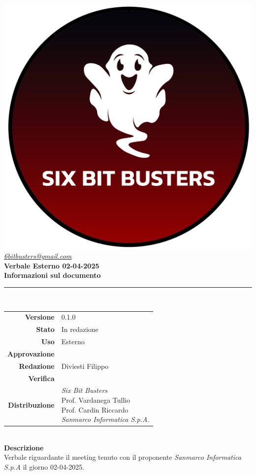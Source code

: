 \thispagestyle{empty}
\renewcommand{\arraystretch}{1.3}


\begin{titlepage}
	\begin{center}
		
	\includegraphics[scale = 0.7]{template/images/logo-circle.png}
	\\[1cm]
	\href{mailto:6bitbusters@gmail.com}		      	
	{\large{\textit{6bitbusters@gmail.com} } }\\[1cm]
	
	\Huge \textbf{Verbale Esterno 02-04-2025} \\[1cm]

	\large \textbf{Informazioni sul documento} \\
	\rule{0.6\textwidth}{0.4pt}
	\\[0.5cm]
	\begin{tabular}{r|l}
		\textbf{Versione} & 0.1.0\\
		\textbf{Stato} & In redazione\\
		\textbf{Uso} & Esterno\\                         
		\textbf{Approvazione} & \\                      
		\textbf{Redazione} & Diviesti Filippo\\ 
		\textbf{Verifica} & \\                         
		\textbf{Distribuzione} & \parbox[t]{6cm}{ \textit{Six Bit Busters} \\ Prof. Vardanega Tullio 
	 \\ Prof. Cardin Riccardo \\ \textit{Sanmarco Informatica S.p.A.}} 
	\end{tabular}	
	\\[1.2cm]

	\large \textbf{Descrizione} \\
	Verbale riguardante il meeting tenuto con il proponente \textit{Sanmarco Informatica S.p.A} il giorno 02-04-2025.
	
	\end{center}
\end{titlepage}
